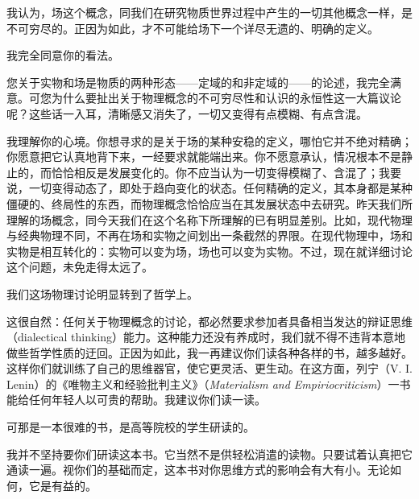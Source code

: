 \begin{dialogue}
\stdb 我认为，场这个概念，同我们在研究物质世界过程中产生的一切其他概念一样，是不可穷尽的。正因为如此，才不可能给场下一个详尽无遗的、明确的定义。

\tchr 我完全同意你的看法。

\stda 您关于实物和场是物质的两种形态——定域的和非定域的——的论述，我完全满意。可您为什么要扯出关于物理概念的不可穷尽性和认识的永恒性这一大篇议论呢？这些话一入耳，清晰感又消失了，一切又变得有点模糊、有点含混。

\tchr 我理解你的心境。你想寻求的是关于场的某种安稳的定义，哪怕它并不绝对精确；你愿意把它认真地背下来，一经要求就能端出来。你不愿意承认，情况根本不是静止的，而恰恰相反是发展变化的。你不应当认为一切变得模糊了、含混了；我要说，一切变得动态了，即处于趋向变化的状态。任何精确的定义，其本身都是某种僵硬的、终局性的东西，而物理概念恰恰应当在其发展状态中去研究。昨天我们所理解的场概念，同今天我们在这个名称下所理解的已有明显差别。比如，现代物理与经典物理不同，不再在场和实物之间划出一条截然的界限。在现代物理中，场和实物是相互转化的：实物可以变为场，场也可以变为实物。不过，现在就详细讨论这个问题，未免走得太远了。

\stdb 我们这场物理讨论明显转到了哲学上。

\tchr 这很自然：任何关于物理概念的讨论，都必然要求参加者具备相当发达的辩证思维（dialectical thinking）能力。这种能力还没有养成时，我们就不得不违背本意地做些哲学性质的迂回。正因为如此，我一再建议你们读各种各样的书，越多越好。这样你们就训练了自己的思维器官，使它更灵活、更生动。在这方面，列宁（V. I. Lenin）的《唯物主义和经验批判主义》（\emph{Materialism and Empiriocriticism}）一书能给任何年轻人以可贵的帮助。我建议你们读一读。

\stda 可那是一本很难的书，是高等院校的学生研读的。

\tchr 我并不坚持要你们研读这本书。它当然不是供轻松消遣的读物。只要试着认真把它通读一遍。视你们的基础而定，这本书对你思维方式的影响会有大有小。无论如何，它是有益的。


\end{dialogue}
